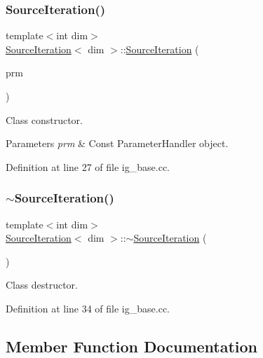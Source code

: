 \subsubsection{\texorpdfstring{Source\+Iteration()}{SourceIteration()}}
{\footnotesize\ttfamily template$<$int dim$>$ \\
\hyperlink{class_source_iteration}{Source\+Iteration}$<$ dim $>$\+::\hyperlink{class_source_iteration}{Source\+Iteration} (\begin{DoxyParamCaption}\item[{const Parameter\+Handler \&}]{prm }\end{DoxyParamCaption})}

Class constructor.


\begin{DoxyParams}{Parameters}
{\em prm} & Const Parameter\+Handler object. \\
\hline
\end{DoxyParams}


Definition at line 27 of file ig\+\_\+base.\+cc.

\mbox{\label{class_source_iteration_ae18057a8b8501d9e89b08ecfb33ef499}} 
\subsubsection{\texorpdfstring{$\sim$\+Source\+Iteration()}{~SourceIteration()}}
{\footnotesize\ttfamily template$<$int dim$>$ \\
\hyperlink{class_source_iteration}{Source\+Iteration}$<$ dim $>$\+::$\sim$\hyperlink{class_source_iteration}{Source\+Iteration} (\begin{DoxyParamCaption}{ }\end{DoxyParamCaption})}



Class destructor. 



Definition at line 34 of file ig\+\_\+base.\+cc.



\subsection{Member Function Documentation}
\mbox{\label{class_source_iteration_a6d726b9a581391cc4164c29f4ccd1ca5}} 
